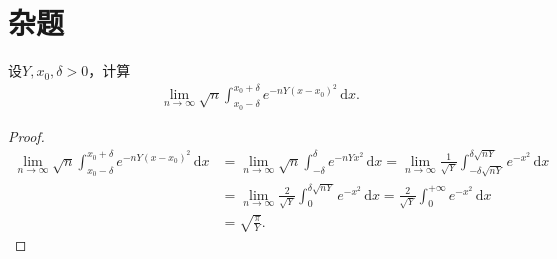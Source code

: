 \documentclass[../../main.tex]{subfiles}
\begin{document}
\section{杂题}

\begin{example}
设$Y,x_0,\delta > 0$，计算
\begin{align*}
\lim_{n \to \infty} \sqrt{n} \int_{x_0 - \delta}^{x_0 + \delta} e^{-nY(x - x_0)^2} \,\mathrm{d}x.
\end{align*}
\end{example}
\begin{proof}
\begin{align*}
\underset{n\rightarrow \infty}{\lim}\sqrt{n}\int_{x_0-\delta}^{x_0+\delta}{e^{-nY(x-x_0)^2}\,\mathrm{d}x}&=\underset{n\rightarrow \infty}{\lim}\sqrt{n}\int_{-\delta}^{\delta}{e^{-nYx^2}\,\mathrm{d}x}=\underset{n\rightarrow \infty}{\lim}\frac{1}{\sqrt{Y}}\int_{-\delta \sqrt{nY}}^{\delta \sqrt{nY}}{e^{-x^2}\,\mathrm{d}x}
\\
&=\underset{n\rightarrow \infty}{\lim}\frac{2}{\sqrt{Y}}\int_0^{\delta \sqrt{nY}}{e^{-x^2}\,\mathrm{d}x}=\frac{2}{\sqrt{Y}}\int_0^{+\infty}{e^{-x^2}\,\mathrm{d}x}
\\
&=\sqrt{\frac{\pi}{Y}}.
\end{align*}
\end{proof}
\end{document}
